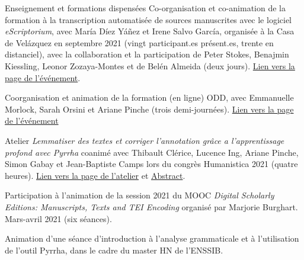 \begin{rubric}{Enseignement et formations dispensées}
                                \entry*
                            Co-organisation et co-animation de la formation à la transcription
                        automatisée de sources manuscrites avec le logiciel \textit{eScriptorium},
                        avec María Díez Yáñez et Irene Salvo García, organisée à la Casa de Velázquez en
                        septembre 2021 (vingt participant.es présent.es, trente en distanciel), avec la
                        collaboration et la participation de Peter Stokes, Benajmin Kiessling, Leonor
                        Zozaya-Montes et de Belén Almeida (deux jours). \href{https://www.casadevelazquez.org/news/formation-seminaire-sur-la-transcription-automatisee-de-sources-manuscrites-avec-escriptorium/}{Lien vers la page de l'événement}.
                    
                                \entry*[2020-2021]
                                
                            Coorganisation et animation de la formation (en ligne) ODD, avec Emmanuelle
                        Morlock, Sarah Orsini et Ariane Pinche (trois demi-journées). \href{https://tei-odd-2021.sciencesconf.org/}{Lien vers la page de
                            l'événement}
                    
                                \entry*
                            Atelier \textit{Lemmatiser des textes et corriger l'annotation grâce a
                            l'apprentissage profond avec Pyrrha} coanimé avec Thibault Clérice,
                        Lucence Ing, Ariane Pinche, Simon Gabay et Jean-Baptiste Camps lors du congrès
                        Humanistica 2021 (quatre heures). \href{https://humanistica2021.sciencesconf.org/341021}{Lien vers la page de
                            l'atelier} et \href{https://hal.archives-ouvertes.fr/hal-03224112/file/abstract.pdf}{Abstract}.
                    
                                \entry*
                            Participation à l'animation de la session 2021 du MOOC \textit{Digital
                            Scholarly Editions: Manuscripts, Texts and TEI Encoding} organisé par
                        Marjorie Burghart. Mars-avril 2021 (six séances).
                    
                                \entry*
                            Animation d'une séance d'introduction à l'analyse grammaticale et à
                        l'utilisation de l'outil Pyrrha, dans le cadre du master HN de
                        l'ENSSIB.
                    

\end{rubric}
